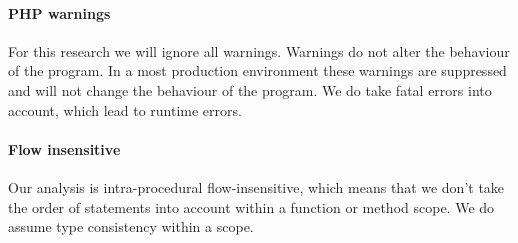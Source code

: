 \documentclass[../main.tex]{subfiles}
\begin{document}
    \paragraph{PHP warnings}
    For this research we will ignore all warnings.
    Warnings do not alter the behaviour of the program.
    In a most production environment these warnings are suppressed and will not change the behaviour of the program.
    We do take fatal errors into account, which lead to runtime errors.
    
    \paragraph{Flow insensitive}
    Our analysis is intra-procedural flow-insensitive, which means that we don't take the order of statements into account within a function or method scope.
    We do assume type consistency within a scope.
        
\end{document}
